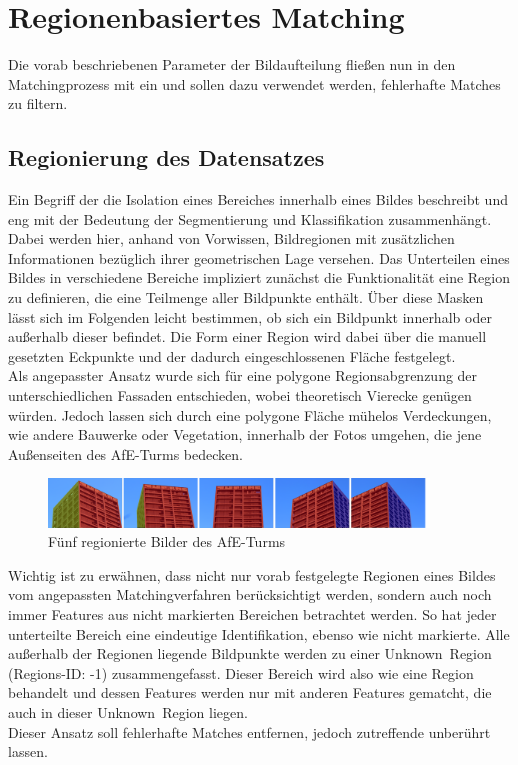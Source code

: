 \chapter{Regionenbasiertes Matching}
Die vorab beschriebenen Parameter der Bildaufteilung flie\ss en nun in den Matchingprozess mit ein und sollen dazu verwendet werden, fehlerhafte Matches zu filtern.


\section{Regionierung des Datensatzes}
Ein Begriff der die Isolation eines Bereiches innerhalb eines Bildes beschreibt und eng mit der Bedeutung der Segmentierung und Klassifikation zusammenh\"angt. Dabei werden hier, anhand von Vorwissen, Bildregionen mit zus\"atzlichen Informationen bez\"uglich ihrer geometrischen Lage versehen. Das Unterteilen eines Bildes in verschiedene Bereiche impliziert zun\"achst die Funktionalit\"at eine Region zu definieren, die eine Teilmenge aller Bildpunkte enth\"alt. \"Uber diese Masken l\"asst sich im Folgenden leicht bestimmen, ob sich ein Bildpunkt innerhalb oder au\ss erhalb dieser befindet. Die Form einer Region wird dabei \"uber die manuell gesetzten Eckpunkte und der dadurch eingeschlossenen Fl\"ache festgelegt.\\
Als angepasster Ansatz wurde sich f\"ur eine polygone Regionsabgrenzung der unterschiedlichen Fassaden entschieden, wobei theoretisch Vierecke gen\"ugen w\"urden. Jedoch lassen sich durch eine polygone Fl\"ache m\"uhelos Verdeckungen, wie andere Bauwerke oder Vegetation, innerhalb der Fotos umgehen, die jene Au\ss enseiten des AfE-Turms bedecken.

\begin{figure}[h]
\centering
\includegraphics[width=0.9\textwidth]{gfx/regreihe.png}
\caption[F\"unf regionierte Bilder des AfE-Turms]{F\"unf regionierte Bilder des AfE-Turms}
\label{gr:afeturmreg}
\end{figure}
\FloatBarrier

Wichtig ist zu erw\"ahnen, dass nicht nur vorab festgelegte Regionen eines Bildes vom angepassten Matchingverfahren ber\"ucksichtigt werden, sondern auch noch immer Features aus nicht markierten Bereichen betrachtet werden. So hat jeder unterteilte Bereich eine eindeutige Identifikation, ebenso wie nicht markierte. Alle au\ss erhalb der Regionen liegende Bildpunkte werden zu einer \glqq Unknown\grqq \ Region (Regions-ID: -1) zusammengefasst. Dieser Bereich wird also wie eine Region behandelt und dessen Features werden nur mit anderen Features gematcht, die auch in dieser \glqq Unknown\grqq \ Region liegen.\\
Dieser Ansatz soll fehlerhafte Matches entfernen, jedoch zutreffende unber\"uhrt lassen.

